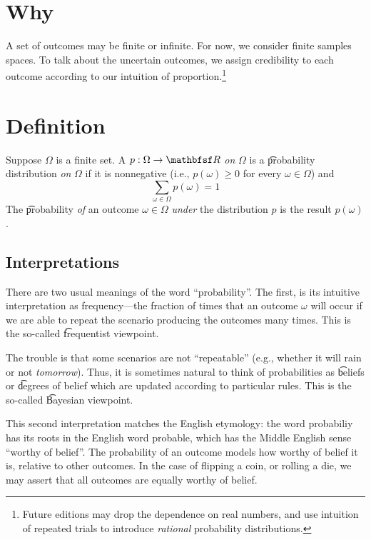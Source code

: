 
\section*{Why}

A set of outcomes may be finite or infinite.
For now, we consider finite samples spaces.
To talk about the uncertain outcomes, we assign credibility to each outcome according to our intuition of proportion.\footnote{Future editions may drop the dependence on real numbers, and use intuition of repeated trials to introduce \textit{rational} probability distributions.}

\section*{Definition}

Suppose $\Omega $ is a finite set.
A $p: \Omega  \to \R $ \textit{on} $\Omega $ is a \t{probability distribution} \textit{on} $\Omega $ if it is nonnegative (i.e., $p(\omega ) \geq 0$ for every $\omega  \in \Omega $) and
\[
\textstyle
\sum_{\omega  \in \Omega } p(\omega ) = 1
\]
The \t{probability} \textit{of} an outcome $\omega  \in \Omega $ \textit{under} the distribution $p$ is the result $p(\omega )$.

\subsection*{Interpretations}

There are two usual meanings of the word ``probability''.
The first, is its intuitive interpretation as frequency---the fraction of times that an outcome $\omega $ will occur if we are able to repeat the scenario producing the outcomes many times.
This is the so-called \t{frequentist} viewpoint.

The trouble is that some scenarios are not ``repeatable'' (e.g., whether it will rain or not \textit{tomorrow}).
Thus, it is sometimes natural to think of probabilities as \t{beliefs} or \t{degrees of belief} which are updated according to particular rules.
This is the so-called \t{Bayesian viewpoint}.

This second interpretation matches the English etymology: the word probabiliy has its roots in the English word probable, which has the Middle English sense ``worthy of belief''.
The probability of an outcome models how worthy of belief it is, relative to other outcomes.
In the case of flipping a coin, or rolling a die, we may assert that all outcomes are equally worthy of belief.

